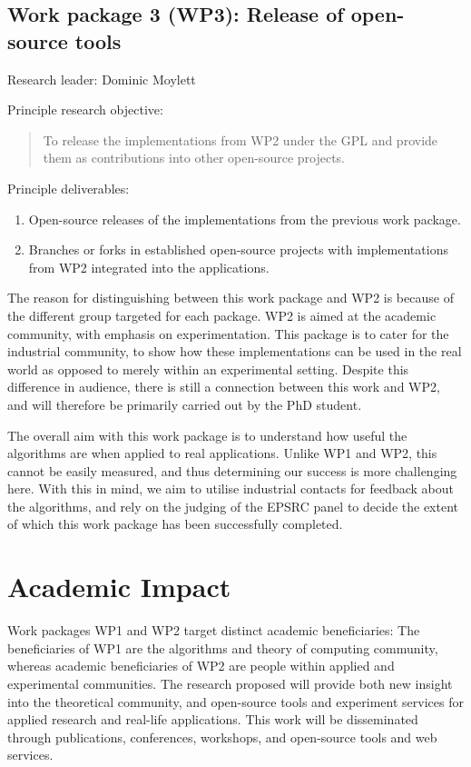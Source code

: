 \documentclass[a4paper,11pt]{article}
\begin{document}
    \subsection*{Work package 3 (WP3): Release of open-source tools}

    Research leader: Dominic Moylett

    Principle research objective:
    \begin{quote}
        To release the implementations from WP2 under the GPL and provide them as contributions into other open-source projects.
    \end{quote}

    Principle deliverables:
    \begin{enumerate}
        \item Open-source releases of the implementations from the previous work package.
        \item Branches or forks in established open-source projects with implementations from WP2 integrated into the applications.
    \end{enumerate}

    The reason for distinguishing between this work package and WP2 is because of the different group targeted for each package. WP2 is aimed at the academic community, with emphasis on experimentation. This package is to cater for the industrial community, to show how these implementations can be used in the real world as opposed to merely within an experimental setting. Despite this difference in audience, there is still a connection between this work and WP2, and will therefore be primarily carried out by the PhD student.

    The overall aim with this work package is to understand how useful the algorithms are when applied to real applications. Unlike WP1 and WP2, this cannot be easily measured, and thus determining our success is more challenging here. With this in mind, we aim to utilise industrial contacts for feedback about the algorithms, and rely on the judging of the EPSRC panel to decide the extent of which this work package has been successfully completed.

    \section{Academic Impact}

    Work packages WP1 and WP2 target distinct academic beneficiaries: The beneficiaries of WP1 are the algorithms and theory of computing community, whereas academic beneficiaries of WP2 are people within applied and experimental communities. The research proposed will provide both new insight into the theoretical community, and open-source tools and experiment services for applied research and real-life applications. This work will be disseminated through publications, conferences, workshops, and open-source tools and web services.
    
\end{document}
